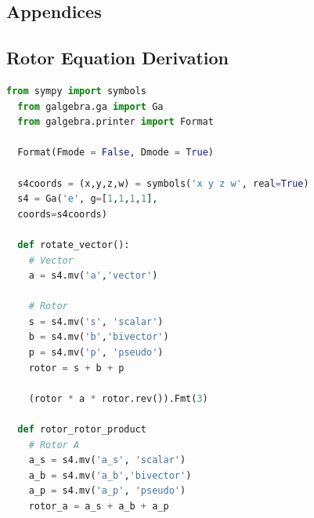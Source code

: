 \documentclass{l4proj}
\begin{document}
\begin{appendices}

\chapter{Appendices}

\section{Rotor Equation Derivation}


\begin{lstlisting}[language=python, caption={
  Rotor4 product derivation using Geometric Algebra in python: \\
  Rotor4-Vector rotation using double reflection; producing \cref{eq:rotate_vec}.\\
  Rotor4-Rotor4 product to apply a 4D Rotor to another 4D Rotor; producing \cref{eq:rotate_rotor}.
  }, label=lst:rotor_derivation]
  from sympy import symbols
  from galgebra.ga import Ga
  from galgebra.printer import Format
  
  Format(Fmode = False, Dmode = True)
  
  s4coords = (x,y,z,w) = symbols('x y z w', real=True)
  s4 = Ga('e', g=[1,1,1,1],
  coords=s4coords)
  
  def rotate_vector():
    # Vector
    a = s4.mv('a','vector')

    # Rotor
    s = s4.mv('s', 'scalar')
    b = s4.mv('b','bivector')
    p = s4.mv('p', 'pseudo')
    rotor = s + b + p
  
    (rotor * a * rotor.rev()).Fmt(3)
  
  def rotor_rotor_product
    # Rotor A
    a_s = s4.mv('a_s', 'scalar')
    a_b = s4.mv('a_b','bivector')
    a_p = s4.mv('a_p', 'pseudo')
    rotor_a = a_s + a_b + a_p
  

\end{lstlisting}
\end{appendices}
\end{document}
